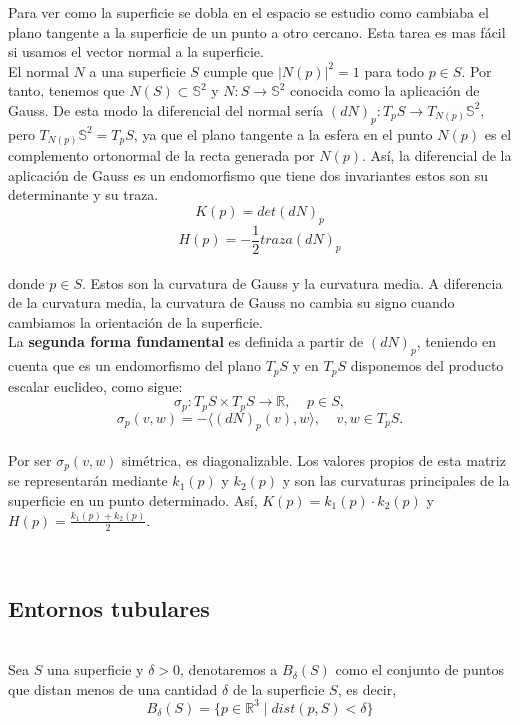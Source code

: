 Para ver como la superficie se dobla en el espacio se estudio como cambiaba el plano tangente a la superficie de un punto a otro cercano. Esta tarea es mas fácil si usamos el vector normal a la superficie.
${ }$\\

El normal $N$ a una superficie $S$ cumple que $|N(p)|^2 = 1$ para todo $p \in S$. Por tanto, tenemos que $N(S) \subset \mathbb{S}^2$ y $N : S \to \mathbb{S}^2$ conocida como la aplicación de Gauss. De esta modo la diferencial del normal sería $(dN)_p : T_p S \to T_{N(p)} \mathbb{S}^2$, pero $T_{N(p)} \mathbb{S}^2 = T_p S$, ya que el plano tangente a la esfera en el punto $N(p)$ es el complemento ortonormal de la recta generada por $N(p)$. Así, la diferencial de la aplicación de Gauss es un endomorfismo que tiene dos invariantes estos son su determinante y su traza.
${ }$\\
$$ K(p) = det(dN)_p $$
$$ H(p) = - \frac{1}{2} traza(dN)_p $$
${ }$\\
donde $p \in S$. Estos son la curvatura de Gauss y la curvatura media. A diferencia de la curvatura media, la curvatura de Gauss no cambia su signo cuando cambiamos la orientación de la superficie.
${ }$\\

La \textbf{segunda forma fundamental} es definida a partir de $(dN)_p$, teniendo en cuenta que es un endomorfismo del plano $T_p S$ y en $T_p S$ disponemos del producto escalar euclideo, como sigue:
${ }$\\
$$ \sigma_p : T_pS \times T_pS \to \mathbb{R}, \;\;\;\; p \in S, $$
$$ \sigma_p(v,w) = - \langle (dN)_p(v), w \rangle, \;\;\;\; v,w \in T_pS. $$
${ }$\\


Por ser $\sigma_p(v,w)$ simétrica, es diagonalizable. Los valores propios de esta matriz se representarán mediante $k_1(p)$ y $k_2(p)$ y son las curvaturas principales de la superficie en un punto determinado. Así, $K(p) = k_1(p) \cdot k_2(p)$ y $H(p) = \frac{k_1(p) + k_2(p)}{2}$.


${ }$\\
\subsection{Entornos tubulares}
${ }$\\

Sea $S$ una superficie y $\delta > 0$, denotaremos a $B_{\delta}(S)$ como el conjunto de puntos que distan menos de una cantidad $\delta$ de la superficie $S$, es decir,
${ }$\\
$$ B_{\delta}(S) = \{p \in \mathbb{R}^3 \; | \; dist(p,S) < \delta\} $$
${ }$\\



